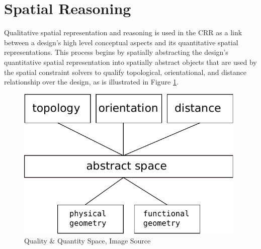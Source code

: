 \documentclass[12pt]{ucthesis}
\begin{document}



\section{Spatial Reasoning}
Qualitative spatial representation and reasoning is used in the CRR as a link between a design's high level conceptual aspects and its quantitative spatial representations. This process begins by spatially abstracting the design's quantitative spatial representation into spatially abstract objects that are used by the spatial constraint solvers to qualify topological, orientational, and distance relationship over the design, as is illustrated in Figure \ref{quality-quantity-space}. 

\begin{figure}[H]
\centering
\includegraphics[width=110mm]{reasoner-design}
\caption{Quality \& Quantity Space, Image Source \cite{house image from http://www.tinyhomes.com/TH2163_SimpleElegance.html}}
\label{quality-quantity-space}
\end{figure}
\end{document}
